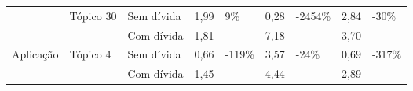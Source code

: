 \begin{longtable}{|l|l|l|l|l|l|l|l|l|}
\newpage
\hline
\multirow{2}{*}{Ferramenta}    & \multirow{2}{*}{Tópico 30} & Sem dívida              & 1,99            & \multirow{2}{*}{9\%}    & 0,28            & \multirow{2}{*}{-2454\%} & 2,84            & \multirow{2}{*}{-30\%}  \\ \cline{3-4} \cline{6-6} \cline{8-8}
                               &                            & Com dívida           & 1,81            &                         & 7,18            &                          & 3,70            &                         \\ \hline
\multirow{2}{*}{Aplicação}     & \multirow{2}{*}{Tópico 4}  & Sem dívida              & 0,66            & \multirow{2}{*}{-119\%} & 3,57            & \multirow{2}{*}{-24\%}   & 0,69            & \multirow{2}{*}{-317\%} \\ \cline{3-4} \cline{6-6} \cline{8-8}
                               &                            & Com dívida           & 1,45            &                         & 4,44            &                          & 2,89            &                         \\ \hline


\end{longtable}
